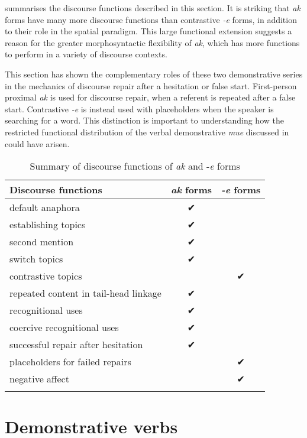 \documentclass[output=paper,colorlinks,citecolor=brown]{langscibook}
\begin{document}
 summarises the discourse functions described in this section. It is striking that \textit{ak} forms have many more discourse functions than contrastive \textit{-e} forms, in addition to their role in the spatial paradigm. This large functional extension suggests a reason for the greater morphosyntactic flexibility of \textit{ak}, which has more functions to perform in a variety of discourse contexts.

This section has shown the complementary roles of these two demonstrative series in the mechanics of discourse repair after a hesitation or false start. First-person proximal \textit{ak} is used for discourse repair, when a referent is repeated after a false start. Contrastive \textit{-e} is instead used with placeholders when the speaker is searching for a word. This distinction is important to understanding how the restricted functional distribution of the verbal demonstrative \textit{mue} discussed in  could have arisen.

\begin{table}
\caption{Summary of discourse functions of \textit{ak} and -\textit{e} forms}
\label{tab:ridge:8}
\begin{tabularx}{.8\textwidth}{Xcc}
\lsptoprule
\textbf{Discourse functions} & \textbf{\textit{ak} forms} & \textbf{\textit{-e} forms}\\
\midrule
{default anaphora} & {✔} & \\
{establishing topics} & {✔} & \\
{second mention} & {✔} & \\
{switch topics} & {✔} & \\
{contrastive topics} &  & {✔}\\
{repeated content in tail-head linkage} & {✔} & \\
{recognitional uses} & {✔} & \\
{coercive recognitional uses} & {✔} & \\
{successful repair after hesitation} & {✔} & \\
{placeholders for failed repairs} &  & {✔}\\
{negative affect} &  & {✔}\\
\lspbottomrule
\end{tabularx}
\end{table}

\section{Demonstrative verbs}
\label{sec:ridge:5}
\end{document}
